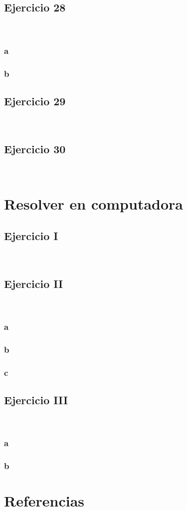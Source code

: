 \documentclass{article}
\begin{document}
\subsection*{Ejercicio 28}

\

\subsubsection*{a}

\subsubsection*{b}

\subsection*{Ejercicio 29}

\

\subsection*{Ejercicio 30}

\

\section*{Resolver en computadora}

\subsection*{Ejercicio I}

\

\subsection*{Ejercicio II}

\

\subsubsection*{a}

\subsubsection*{b}

\subsubsection*{c}

\subsection*{Ejercicio III}

\

\subsubsection*{a}

\subsubsection*{b}

\section*{Referencias}

\
\end{document}
